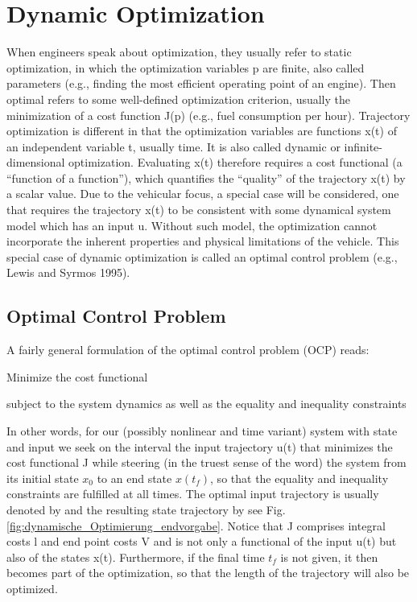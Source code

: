 \section{Dynamic Optimization}\label{DO}

When engineers speak about optimization, they usually refer to static optimization, in which the optimization variables p are finite, also called parameters (e.g., finding the most efficient operating point of an engine). Then optimal refers to some well-defined optimization criterion, usually the minimization of a cost function J(p) (e.g., fuel consumption per hour). 
Trajectory optimization is different in that the optimization variables are functions x(t) of an independent variable t, usually time. It is also called dynamic or infinite-dimensional optimization. Evaluating x(t) therefore requires a cost functional (a “function of a function”), which quantifies the “quality” of the trajectory x(t) by a scalar value. 
Due to the vehicular focus, a special case will be considered, one that requires the trajectory x(t) to be consistent with some dynamical system model which has an input u. Without such model, the optimization cannot incorporate the inherent properties and physical limitations of the vehicle. This special case of dynamic optimization is called an optimal control problem (e.g., Lewis and Syrmos 1995).

\subsection{Optimal Control Problem}
A fairly general formulation of the optimal control problem (OCP) reads:


Minimize the cost functional

subject to the system dynamics
as well as the equality and inequality constraints


In other words, for our (possibly nonlinear and time variant) system with state %
and input %
we seek on the interval %
the input trajectory u(t) that minimizes the cost functional J while steering (in the truest sense of the word) the system from its initial state $x_0$ to an end state $x(t_f )$, so that the equality and inequality constraints are fulfilled at all times. The optimal input trajectory is usually denoted by 
and the resulting state trajectory by %
see Fig. \ref{fig:dynamische_Optimierung_endvorgabe}. Notice that J comprises integral costs l and end point costs V and is not only a functional of the input u(t) but also of the states x(t). Furthermore, if the final time $t_f$ is not given, it then becomes part of the optimization, so that the length of the trajectory will also be optimized.

